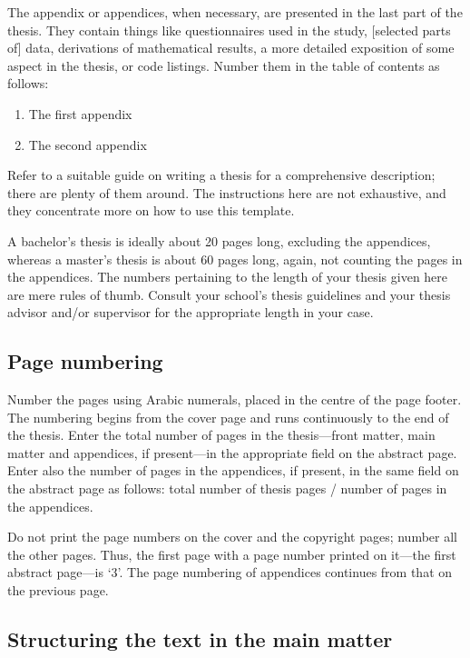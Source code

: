 \documentclass[english, 12pt, a4paper, sci, utf8, a-2b, online]{aaltothesis}
\begin{document}
The appendix or appendices, when necessary, are presented in the last part of
the thesis. They contain things like questionnaires used in the study, 
[selected parts of] data, derivations of mathematical results, a more detailed 
exposition of some aspect in the thesis, or code listings. Number them in the 
table of contents as follows:
\begin{enumerate}
\renewcommand{\labelenumi}{\Alph{enumi}.}
	\item The first appendix
	\item The second appendix
\end{enumerate}

Refer to a suitable guide on writing a thesis for a comprehensive description;
there are plenty of them around. The instructions here are not exhaustive, and
they concentrate more on how to use this template.

A bachelor’s thesis is ideally about 20 pages long, excluding the appendices, 
whereas a master’s thesis is about 60 pages long, again, not counting the pages
in the appendices. The numbers pertaining to the length of your thesis given
here are mere rules of thumb. Consult your school’s thesis guidelines and your 
thesis advisor and/or supervisor for the appropriate length in your case.


\subsection{Page numbering}
Number the pages using Arabic numerals, placed in the centre of the page footer.
The numbering begins from the cover page and runs continuously to the end of the 
thesis. Enter the total number of pages in the thesis---front matter, main
matter and appendices, if present---in the appropriate field on the abstract
page. Enter also the number of pages in the appendices, if present, in the same 
field on the abstract page as follows: total number of thesis pages / number of 
pages in the appendices.

Do not print the page numbers on the cover and the copyright pages; number all
the other pages. Thus, the first page with a page number printed on it---the
first abstract page---is ‘3’. The page numbering of appendices continues from
that on the previous page.


\subsection{Structuring the text in the main matter}
\end{document}
